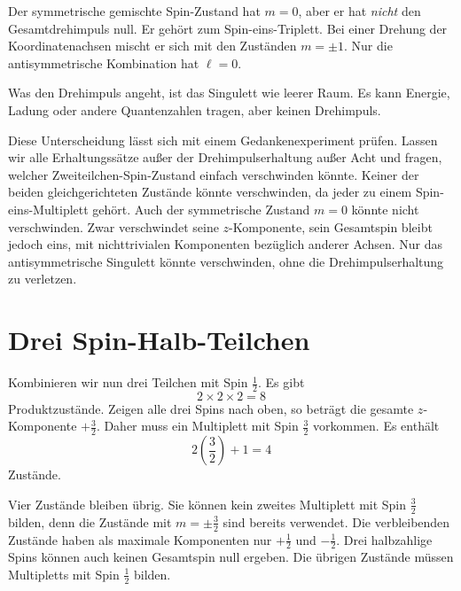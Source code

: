 Der symmetrische gemischte Spin-Zustand hat \(m=0\), aber er hat \emph{nicht} den Gesamtdrehimpuls null. Er gehört zum Spin-eins-Triplett. Bei einer Drehung der Koordinatenachsen mischt er sich mit den Zuständen \(m=\pm1\). Nur die antisymmetrische Kombination hat \(\ell=0\).

Was den Drehimpuls angeht, ist das Singulett wie leerer Raum. Es kann Energie, Ladung oder andere Quantenzahlen tragen, aber keinen Drehimpuls.

Diese Unterscheidung lässt sich mit einem Gedankenexperiment prüfen. Lassen wir alle Erhaltungssätze außer der Drehimpulserhaltung außer Acht und fragen, welcher Zweiteilchen-Spin-Zustand einfach verschwinden könnte. Keiner der beiden gleichgerichteten Zustände könnte verschwinden, da jeder zu einem Spin-eins-Multiplett gehört. Auch der symmetrische Zustand \(m=0\) könnte nicht verschwinden. Zwar verschwindet seine \(z\)-Komponente, sein Gesamtspin bleibt jedoch eins, mit nichttrivialen Komponenten bezüglich anderer Achsen. Nur das antisymmetrische Singulett könnte verschwinden, ohne die Drehimpulserhaltung zu verletzen.

\begin{classroomqa}
\end{classroomqa}

\section{Drei Spin-Halb-Teilchen}

Kombinieren wir nun drei Teilchen mit Spin \(\tfrac12\). Es gibt
\begin{equation}
2\times2\times2=8
\end{equation}
Produktzustände. Zeigen alle drei Spins nach oben, so beträgt die gesamte \(z\)-Komponente \(+\tfrac32\). Daher muss ein Multiplett mit Spin \(\tfrac32\) vorkommen. Es enthält
\begin{equation}
2\left(\frac32\right)+1=4
\end{equation}
Zustände.

Vier Zustände bleiben übrig. Sie können kein zweites Multiplett mit Spin \(\tfrac32\) bilden, denn die Zustände mit \(m=\pm\tfrac32\) sind bereits verwendet. Die verbleibenden Zustände haben als maximale Komponenten nur \(+\tfrac12\) und \(-\tfrac12\). Drei halbzahlige Spins können auch keinen Gesamtspin null ergeben. Die übrigen Zustände müssen Multipletts mit Spin \(\tfrac12\) bilden.

